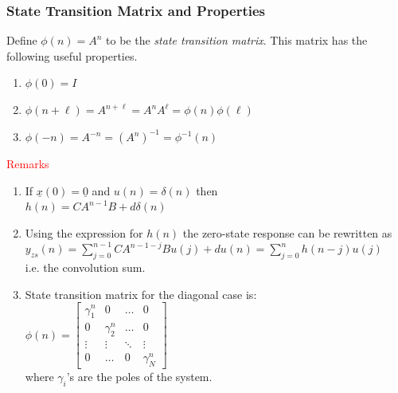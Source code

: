 \documentclass[mathserif, 10pt]{beamer} %
\def\x{\underline{x}}
\begin{document}
\frame
{

\normalsize

\frametitle{State Transition Matrix and Properties}

\vspace{-.05in}
Define $\phi(n) = A^n$ to be the \textit{state transition matrix}. This matrix has the following useful properties. \\
\begin{enumerate}
\item  $\phi (0) = I$\\
\item $\phi(n+\ell) = A^{n+\ell}=A^nA^{\ell} = \phi(n)\phi(\ell)$\\
\item  $\phi(-n) = A^{-n} = (A^n)^{-1} = \phi^{-1}(n)$
\end{enumerate}
\textcolor{red}{Remarks}\\
\begin{enumerate}
	\item If $\x(0) = \underline{0}$ and $u(n) = \delta(n)$ then\\
$h(n) = CA^{n-1}B+d\delta(n)$

\item Using the expression for $h(n)$ the zero-state response can be rewritten as\\
$y_{zs}(n)= \sum\limits_{j=0}^{n-1}CA^{n-1-j}Bu(j) + du(n)= \sum\limits_{j=0}^{n} h(n-j)u(j)$\\
i.e. the convolution sum.
	\item State transition matrix for the diagonal case is:\\
$\phi(n) = \left[
\begin{array}{ccccc}
	\gamma_1^n  &   0                  &      \hdots   &        0\\
	0                     &\gamma_2^n  &\hdots           &0\\
	\vdots             &\vdots             &\ddots           &\vdots\\
	0                     &\hdots             &0&\gamma_N^n
\end{array} \right]$\\ \vspace{.1in}
\vspace{-.1in}
where $\gamma_i$'s are the poles of the system.

    \setcounter{enumTemp}{\theenumi}
\end{enumerate}


}
\end{document}
